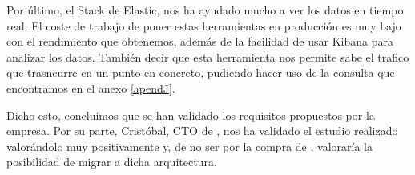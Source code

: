 Por último, el Stack de Elastic, nos ha ayudado mucho a ver los datos en
tiempo real. El coste de trabajo de poner estas herramientas en producción
es muy bajo con el rendimiento que obtenemos, además de la facilidad de
usar Kibana para analizar los datos. También decir que esta herramienta nos
permite sabe el trafico que trasncurre en un punto en concreto, pudiendo
hacer uso de la consulta que encontramos en el anexo \ref{apendJ}.

Dicho esto, concluimos que se han validado los requisitos propuestos por la
empresa. Por su parte, Cristóbal, CTO de \mdata{}, nos ha validado el
estudio realizado valorándolo muy positivamente y, de no ser por la compra
de \vzconnect, valoraría la posibilidad de migrar a dicha arquitectura.

